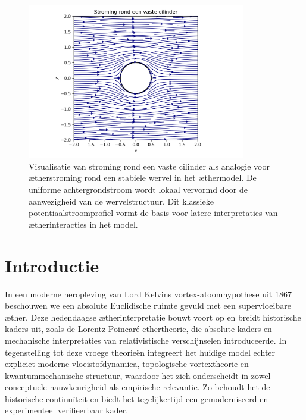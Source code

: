 \begin{figure}[htbp]
    \centering
    \includegraphics[width=0.85\textwidth]{02_cylinder_stroming}
    \caption{Visualisatie van stroming rond een vaste cilinder als analogie voor ætherstroming rond een stabiele wervel in het æthermodel. De uniforme achtergrondstroom wordt lokaal vervormd door de aanwezigheid van de wervelstructuur. Dit klassieke potentiaalstroomprofiel vormt de basis voor latere interpretaties van ætherinteracties in het model.}
    \label{fig:cylinderflow}
\end{figure}

\section{Introductie}
In een moderne heropleving van Lord Kelvins vortex-atoomhypothese uit 1867~\cite{Kelvin1867-vortex} beschouwen we een absolute Euclidische ruimte gevuld met een supervloeibare æther. Deze hedendaagse ætherinterpretatie bouwt voort op en breidt historische kaders uit, zoals de Lorentz-Poincaré-ethertheorie, die absolute kaders en mechanische interpretaties van relativistische verschijnselen introduceerde. In tegenstelling tot deze vroege theorieën integreert het huidige model echter expliciet moderne vloeistofdynamica, topologische vortextheorie en kwantummechanische structuur, waardoor het zich onderscheidt in zowel conceptuele nauwkeurigheid als empirische relevantie. Zo behoudt het de historische continuïteit en biedt het tegelijkertijd een gemoderniseerd en experimenteel verifieerbaar kader.

